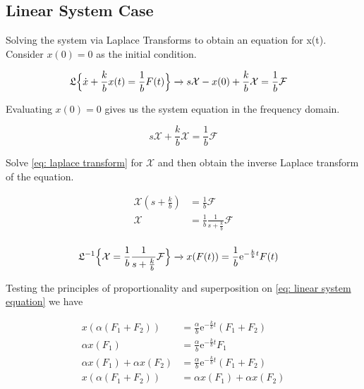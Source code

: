 \subsection{Linear System Case}

Solving the system via Laplace Transforms to obtain an 
equation for x(t). Consider $x(0) = 0$ as the initial 
condition.

\begin{equation}
 \begin{split}
  \mathfrak{L} \Bigl \{ \dot{x} + \frac{k}{b} x(t)  = 
\frac{1}{b} F(t) \Bigr \} & \xrightarrow{} s \mathcal{X} - 
x(0) + \frac{k}{b} \mathcal{X} = \frac{1}{b} \mathcal{F}
 \end{split}
 \label{eq: general laplace transform}
\end{equation}

Evaluating $x(0)=0$ gives us the system equation in the 
frequency domain.

\begin{equation}
 s \mathcal{X} + \frac{k}{b} \mathcal{X} = \frac{1}{b}
\mathcal{F}
\label{eq: laplace transform}
\end{equation}

Solve \ref{eq: laplace transform} for $\mathcal{X}$ and 
then obtain the inverse Laplace transform of the equation.

\begin{equation*}
 \begin{split}
  \mathcal{X} (s + \frac{k}{b}) & = \frac{1}{b} 
\mathcal{F}\\
\mathcal{X} & = \frac{1}{b} \frac{1}{s + \frac{k}{b}}
\mathcal{F}\\
 \end{split}
\end{equation*}


\begin{equation}
 \begin{split}
  \mathfrak{L}^{-1} \Bigl \{ \mathcal{X}  = \frac{1}{b} 
\frac{1}{s + \frac{k}{b}}
\mathcal{F}   \Bigr\} & \xrightarrow{} x(F(t)) = 
\frac{1}{b} \mathrm{e}^{-\frac{k}{b}t} F(t)
 \end{split}
 \label{eq: linear system equation}
\end{equation}

Testing the principles of proportionality and superposition 
on \ref{eq: linear system equation} we have

\begin{equation*}
 \begin{split}
  x(\alpha (F_1 + F_2)) & = \frac{\alpha}{b} 
\mathrm{e}^{-\frac{k}{b}t} (F_1 + F_2)\\
\alpha x(F_1) & = \frac{\alpha}{b} 
\mathrm{e}^{-\frac{k}{b}t} F_1\\
\alpha x(F_1) + \alpha x(F_2) & = \frac{\alpha}{b} 
\mathrm{e}^{-\frac{k}{b}t} (F_1 + F_2)\\
x(\alpha (F_1 + F_2)) & = \alpha x(F_1) + \alpha x(F_2)
 \end{split}
\end{equation*}


